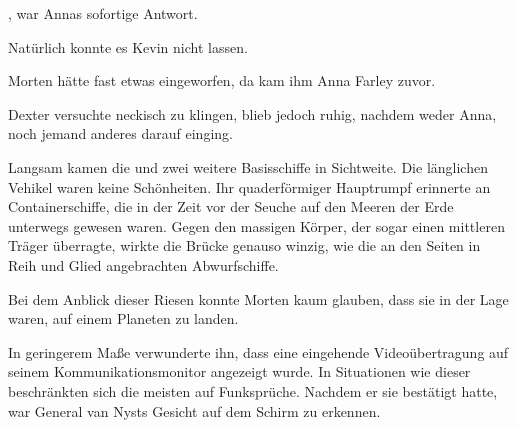\par

, war Annas sofortige Antwort. 

\par

Natürlich konnte es Kevin nicht lassen. 

\par


\par

Morten hätte fast etwas eingeworfen, da kam ihm Anna Farley zuvor. 

\par

 Dexter versuchte neckisch zu klingen, blieb jedoch ruhig, nachdem weder Anna, noch jemand anderes darauf einging.

\par

Langsam kamen die  und zwei weitere Basisschiffe in Sichtweite. Die länglichen Vehikel waren keine Schönheiten. Ihr quaderförmiger Hauptrumpf erinnerte an Containerschiffe, die in der Zeit vor der Seuche auf den Meeren der Erde unterwegs gewesen waren. Gegen den massigen Körper, der sogar einen mittleren Träger überragte, wirkte die Brücke genauso winzig, wie die an den Seiten in Reih und Glied angebrachten Abwurfschiffe.

\par

Bei dem Anblick dieser Riesen konnte Morten kaum glauben, dass sie in der Lage waren, auf einem Planeten zu landen.

\par

In geringerem Maße verwunderte ihn, dass eine eingehende Videoübertragung auf seinem Kommunikationsmonitor angezeigt wurde. In Situationen wie dieser beschränkten sich die meisten auf Funksprüche. Nachdem er sie bestätigt hatte, war General van Nysts Gesicht auf dem Schirm zu erkennen.

\par

